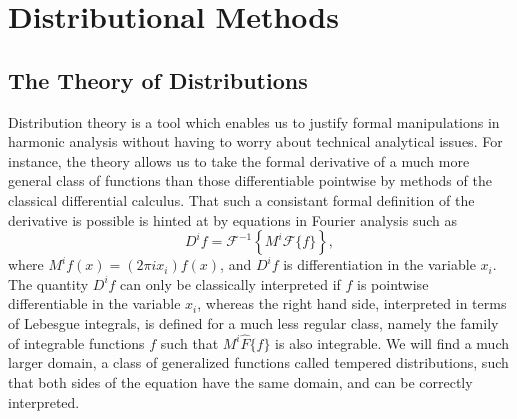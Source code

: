 
\part{Distributional Methods}

\chapter{The Theory of Distributions}

Distribution theory is a tool which enables us to justify formal manipulations in harmonic analysis without having to worry about technical analytical issues. For instance, the theory allows us to take the formal derivative of a much more general class of functions than those differentiable pointwise by methods of the classical differential calculus. That such a consistant formal definition of the derivative is possible is hinted at by equations in Fourier analysis such as
%
\[ D^i f = \mathcal{F}^{-1} \left\{ M^i \mathcal{F} \{ f \} \right\}, \]
%
where $M^i f(x) = (2 \pi i x_i) f(x)$, and $D^i f$ is differentiation in the variable $x_i$. The quantity $D^i f$ can only be classically interpreted if $f$ is pointwise differentiable in the variable $x_i$, whereas the right hand side, interpreted in terms of Lebesgue integrals, is defined for a much less regular class, namely the family of integrable functions $f$ such that $M^i \widehat{F} \{ f \}$ is also integrable. We will find a much larger domain, a class of generalized functions called tempered distributions, such that both sides of the equation have the same domain, and can be correctly interpreted.

